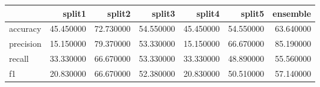 \begin{tabular}{lrrrrrr}
    \toprule
     & split1 & split2 & split3 & split4 & split5 & ensemble \\
    \midrule
    accuracy & 45.450000 & 72.730000 & 54.550000 & 45.450000 & 54.550000 & 63.640000 \\
    precision & 15.150000 & 79.370000 & 53.330000 & 15.150000 & 66.670000 & 85.190000 \\
    recall & 33.330000 & 66.670000 & 53.330000 & 33.330000 & 48.890000 & 55.560000 \\
    f1 & 20.830000 & 66.670000 & 52.380000 & 20.830000 & 50.510000 & 57.140000 \\
    \bottomrule
    \end{tabular}